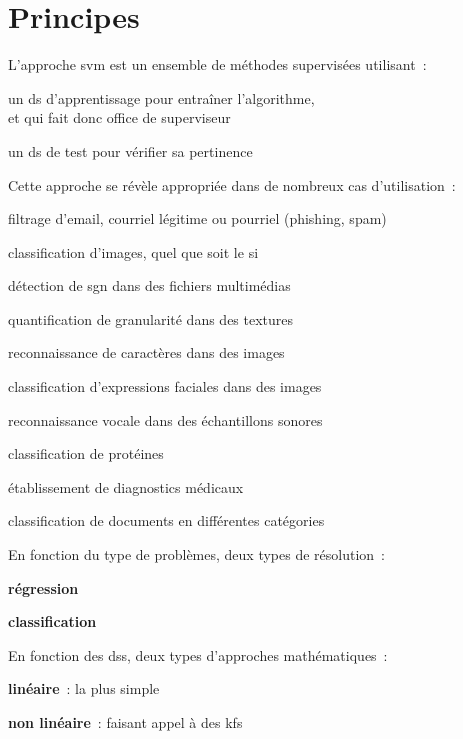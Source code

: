 \section{Principes}

L’approche \gls{svm} est un ensemble de méthodes supervisées utilisant :
\begin{enum}
\item{un \gls{ds} d’apprentissage pour entraîner l’algorithme,\\
et qui fait donc office de superviseur}
\item{un \gls{ds} de test pour vérifier sa pertinence}
\end{enum}

Cette approche se révèle appropriée dans de nombreux cas d’utilisation :
\begin{itmz}
\item{filtrage d’email, courriel légitime ou pourriel (phishing, spam)}
\item{classification d’images, quel que soit le \gls{si}}
\item{détection de \gls{sgn} dans des fichiers multimédias}
\item{quantification de granularité dans des textures}
\item{reconnaissance de caractères dans des images}
\item{classification d’expressions faciales dans des images}
\item{reconnaissance vocale dans des échantillons sonores}
\item{classification de protéines}
\item{établissement de diagnostics médicaux}
\item{classification de documents en différentes catégories}
\end{itmz}

En fonction du type de problèmes, deux types de résolution :
\begin{itmz}
\item{\textbf{régression}}
\item{\textbf{classification}}
\end{itmz}

En fonction des \glspl{ds}, deux types d’approches mathématiques :
\begin{itmz}
\item{\textbf{linéaire} : la plus simple}
\item{\textbf{non linéaire} : faisant appel à des \glspl{kf}}
\end{itmz}

